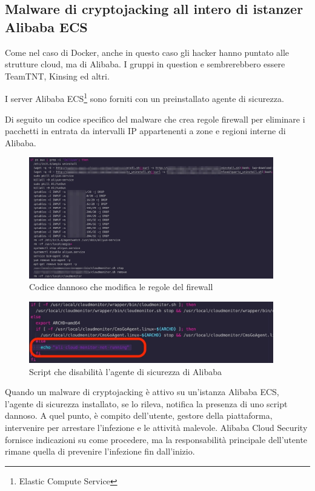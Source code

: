 \documentclass[12pt,a4paper]{article}
\begin{document}
\subsection{Malware di cryptojacking all intero di istanzer Alibaba ECS}
Come nel caso di Docker, anche in questo caso gli hacker hanno puntato alle
strutture cloud, ma di Alibaba. I gruppi in question e sembrerebbero essere
TeamTNT, Kinsing ed altri.

I server Alibaba ECS\footnote{Elastic Compute Service} sono forniti con un
preinstallato agente di sicurezza.  

Di seguito un codice specifico del malware che crea regole firewall per
eliminare i pacchetti in entrata da intervalli IP appartenenti a zone e regioni
interne di Alibaba.

\begin{figure}[ht]
    \centering
    \includegraphics[width=0.95\textwidth]{./images/alibaba_firewall.png}
    \caption{Codice dannoso che modifica le regole del firewall}
    \label{fig:alibaba_firewall}
\end{figure}

\begin{figure}[ht]
    \centering
    \includegraphics[width=0.95\textwidth]{./images/alibaba_agent_disable.png}
    \caption{Script che disabilità l'agente di sicurezza di Alibaba}
    \label{fig:alibaba_agent}
\end{figure}

Quando un malware di cryptojacking è attivo su un'istanza Alibaba ECS, l'agente
di sicurezza installato, se lo rileva, notifica la presenza di uno script
dannoso. A quel punto, è compito dell'utente, gestore della piattaforma,
intervenire per arrestare l'infezione e le attività malevole. Alibaba Cloud
Security fornisce indicazioni su come procedere, ma la responsabilità principale
dell'utente rimane quella di prevenire l'infezione fin dall'inizio.
\end{document}
